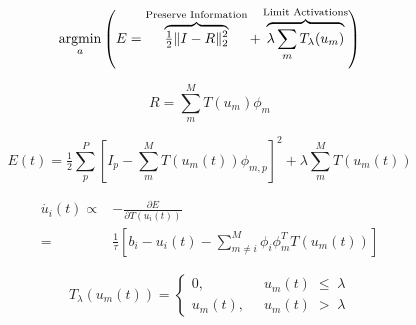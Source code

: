 \documentclass[smallextended]{svjour3}       %
\newcommand{\argmin}{\operatornamewithlimits{argmin}}
\begin{document}
\begin{equation}
    \argmin\limits_{a}
        \left( E =
            \overbrace{ \tfrac{1}{2} \| I - R \|_{2}^{2} }^\text{Preserve Information} +
        \overbrace{ \lambda \sum\limits_{m}T_{\lambda}(u_{m}) }^\text{Limit Activations} \right)
\label{energyfunc}
\end{equation}

\begin{equation}
    R = \sum\limits_{m}^{M} T(u_{m}) \phi_{m}
\label{recon}
\end{equation}

\begin{equation}
    E(t) = \tfrac{1}{2} \sum\limits_{p}^{P} \left[ I_{p} - \sum\limits_{m}^{M}T(u_{m}(t)) \phi_{m,p} \right]^{2} + \lambda \sum\limits_{m}^{M} T(u_{m}(t))
\label{indexenergyfunc}
\end{equation}

\begin{equation}
\begin{aligned}
    \dot{u_{i}}(t) \propto
    &-\frac{\partial E}{\partial T(u_{i}(t))} \\
    = &\frac{1}{\tau} \left[ b_{i} - u_{i}(t) - \sum_{m \neq i}^{M}\phi_{i}\phi_{m}^TT(u_{m}(t)) \right]
\end{aligned}
\label{lcaupdate}
\end{equation}

\begin{equation}
    T_{\lambda}(u_{m}(t)) = \left\{
    \begin{aligned}
        0,\;\; &u_{m}(t)\; \leq\; \lambda \\
        u_{m}(t),\;\; &u_{m}(t)\; >\; \lambda
    \end{aligned}
    \right.
\label{thresholdfunc}
\end{equation}


\end{document}
